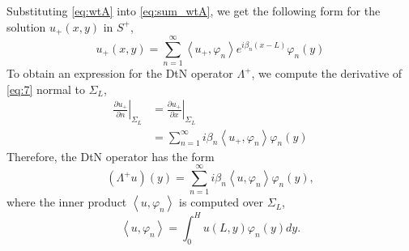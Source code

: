 \documentclass[11pt]{article}
\begin{document}
Substituting \eqref{eq:wtA} into \eqref{eq:sum_wtA}, we get the following form for the solution $u_+(x,y)$ in $S^+$,
\begin{equation}
  \label{eq:7}
  u_+(x,y) = \sum_{n=1}^\infty \left\langle u_+, \varphi_n\right\rangle e^{i \beta_n (x-L)}\varphi_n(y)  
\end{equation}
To obtain an expression for the DtN operator $\Lambda^+$, we compute the derivative of \eqref{eq:7} normal to $\Sigma_L$,
\begin{align}
  \label{eq:8}
  \left.\frac{\partial u_+}{\partial n}\right|_{\Sigma_L} &= \left.\frac{\partial u_+}{\partial x}\right|_{\Sigma_L} \\
                                  &= \sum_{n=1}^\infty i \beta_n \left\langle u_+, \varphi_n\right\rangle \varphi_n(y)
\end{align}
Therefore, the DtN operator has the form
\begin{equation}
  \label{eq:16}
  (\Lambda^+ u)(y) = \sum_{n=1}^\infty i \beta_n \left\langle u, \varphi_n\right\rangle \varphi_n(y),
\end{equation}
where the inner product $\left\langle u, \varphi_n\right\rangle$ is computed over $\Sigma_L$,
\begin{equation}
  \label{eq:17}
  \left\langle u, \varphi_n\right\rangle = \int_0^H u(L,y)\varphi_n(y) dy.
\end{equation}
\end{document}
